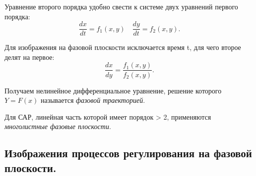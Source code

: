 \documentclass[unicode, 12pt, a4paper, oneside]{article}
\begin{document}
Уравнение второго порядка удобно свести к системе двух уравнений первого порядка:
\begin{equation}
\dfrac{dx}{dt} = f_1(x, y) \quad \dfrac{dy}{dt} = f_2(x, y).
\end{equation}

Для изображения на фазовой плоскости исключается время t, для чего второе делят на первое:
\begin{equation}
\dfrac{dx}{dy} = \dfrac{f_1(x, y)}{f_2(x, y)}.
\end{equation}

Получаем нелинейное дифференциальное уравнение, решение которого $ Y = F(x) $ называется \textit{фазовой траекторией}.

Для САР, линейная часть которой имеет порядок > 2, применяются \textit{многолистные фазовые плоскости}.

\subsection*{Изображения процессов регулирования на фазовой плоскости.}
\end{document}
